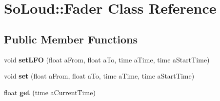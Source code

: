 \hypertarget{class_so_loud_1_1_fader}{}\section{So\+Loud\+:\+:Fader Class Reference}
\label{class_so_loud_1_1_fader}
\subsection*{Public Member Functions}
\begin{DoxyCompactItemize}
\item 
\mbox{\label{class_so_loud_1_1_fader_ab832eabb3306ab0b51a6085f50dfe15c}} 
void {\bfseries set\+L\+FO} (float a\+From, float a\+To, time a\+Time, time a\+Start\+Time)
\item 
\mbox{\label{class_so_loud_1_1_fader_a75bbcceb1df1300da93bb198076a818b}} 
void {\bfseries set} (float a\+From, float a\+To, time a\+Time, time a\+Start\+Time)
\item 
\mbox{\label{class_so_loud_1_1_fader_a7a6639fa22a5d7e10f04a473e65eeba1}} 
float {\bfseries get} (time a\+Current\+Time)
\end{DoxyCompactItemize}
